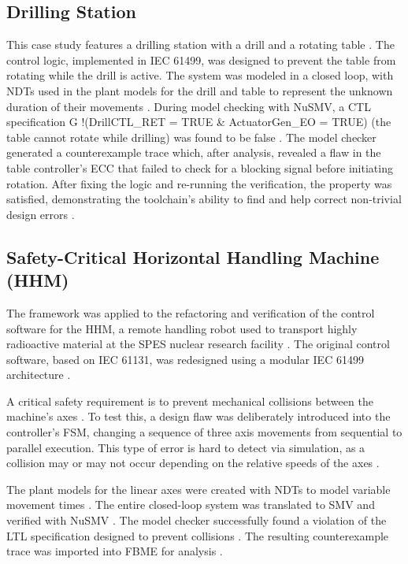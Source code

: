 \subsection{Drilling Station}

This case study features a drilling station with a drill and a rotating table \cite{fb2smv}. The control logic, implemented in IEC 61499, was designed to prevent the table from rotating while the drill is active. The system was modeled in a closed loop, with NDTs used in the plant models for the drill and table to represent the unknown duration of their movements \cite{drozdov2016formal}. During model checking with NuSMV, a CTL specification G !(DrillCTL\_RET = TRUE \& ActuatorGen\_EO = TRUE) (the table cannot rotate while drilling) was found to be false \cite{emerson1985decision}. The model checker generated a counterexample trace which, after analysis, revealed a flaw in the table controller's ECC that failed to check for a blocking signal before initiating rotation. After fixing the logic and re-running the verification, the property was satisfied, demonstrating the toolchain's ability to find and help correct non-trivial design errors \cite{patil2015counterexample}.

\subsection{Safety-Critical Horizontal Handling Machine (HHM)}

The framework was applied to the refactoring and verification of the control software for the HHM, a remote handling robot used to transport highly radioactive material at the SPES nuclear research facility \cite{Marchietal.2020}. The original control software, based on IEC 61131, was redesigned using a modular IEC 61499 architecture \cite{zoitl2014}.

A critical safety requirement is to prevent mechanical collisions between the machine's axes \cite{khan2014}. To test this, a design flaw was deliberately introduced into the controller's FSM, changing a sequence of three axis movements from sequential to parallel execution. This type of error is hard to detect via simulation, as a collision may or may not occur depending on the relative speeds of the axes \cite{patil2015counterexample}.

The plant models for the linear axes were created with NDTs to model variable movement times \cite{xavier2021cyber}. The entire closed-loop system was translated to SMV and verified with NuSMV \cite{fb2smv}. The model checker successfully found a violation of the LTL specification designed to prevent collisions \cite{emerson1985decision}. The resulting counterexample trace was imported into FBME for analysis \cite{liakh2022formal}.

